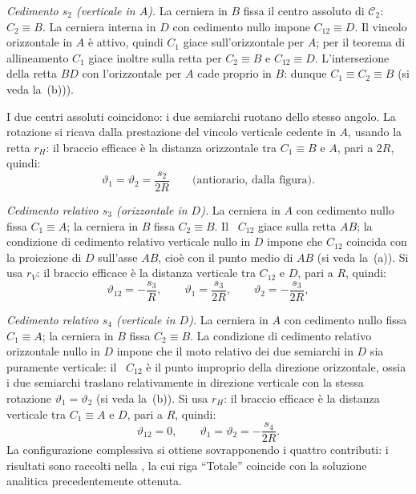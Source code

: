 	
	
	



	
	\noindent\textit{Cedimento $s_2$ (verticale in $A$).}
	La cerniera in $B$ fissa il centro assoluto di
	$\mathcal{C}_2$: $C_2 \equiv B$. La cerniera interna in
	$D$ con cedimento nullo impone $C_{12} \equiv D$.
	Il vincolo orizzontale in $A$ è attivo, quindi $C_1$
	giace sull'orizzontale per $A$; per il teorema di
	allineamento $C_1$ giace inoltre sulla retta per
	$C_2 \equiv B$ e $C_{12} \equiv D$. L'intersezione
	della retta $BD$ con l'orizzontale per $A$ cade
	proprio in $B$: dunque $C_1 \equiv C_2 \equiv B$
	(si veda la \,(b))).
	
	I due centri assoluti coincidono: i due semiarchi
	ruotano dello stesso angolo. La rotazione si ricava
	dalla prestazione del vincolo verticale cedente in $A$,
	usando la retta $r_H$: il braccio efficace è la distanza
	orizzontale tra $C_1 \equiv B$ e $A$, pari a $2R$,
	quindi:
	\begin{equation*}
		\vartheta_1 = \vartheta_2 = \frac{s_2}{2R}
		\qquad \text{(antiorario, dalla figura)}.
	\end{equation*}
	
	
	\smallskip
	\noindent\textit{Cedimento relativo $s_3$
		(orizzontale in $D$).}
	La cerniera in $A$ con cedimento nullo fissa
	$C_1 \equiv A$; la cerniera in $B$ fissa $C_2 \equiv B$.
	Il \CRr\ $C_{12}$ giace sulla retta $AB$; la condizione
	di cedimento relativo verticale nullo in $D$ impone che
	$C_{12}$ coincida con la proiezione di $D$ sull'asse
	$AB$, cioè con il punto medio di $AB$
	(si veda la \,(a)). 
	Si usa $r_V$: il braccio efficace è la distanza verticale
	tra $C_{12}$ e $D$, pari a $R$, quindi:
	\begin{equation*}
		\vartheta_{12} = -\frac{s_3}{R}, \qquad
		\vartheta_1 = \frac{s_3}{2R}, \qquad
		\vartheta_2 = -\frac{s_3}{2R},
	\end{equation*}
	
	\noindent\textit{Cedimento relativo $s_4$
		(verticale in $D$).}
	La cerniera in $A$ con cedimento nullo fissa
	$C_1 \equiv A$; la cerniera in $B$ fissa $C_2 \equiv B$.
	La condizione di cedimento relativo orizzontale nullo
	in $D$ impone che il moto relativo dei due semiarchi
	in $D$ sia puramente verticale: il \CRr\ $C_{12}$ è
	il punto improprio della direzione orizzontale, ossia
	i due semiarchi traslano relativamente in direzione
	verticale con la stessa rotazione
	$\vartheta_1 = \vartheta_2$ (si veda la \,(b)). Si usa $r_H$: il braccio
	efficace è la distanza verticale tra $C_1 \equiv A$ e
	$D$, pari a $R$, quindi:
	\begin{equation*}
		\vartheta_{12} = 0, \qquad
		\vartheta_1 = \vartheta_2 = -\frac{s_4}{2R}.
	\end{equation*}
	La configurazione complessiva si ottiene sovrapponendo
	i quattro contributi: i risultati sono raccolti nella
	, la cui riga
	``Totale'' coincide con la soluzione analitica	precedentemente ottenuta.
	
